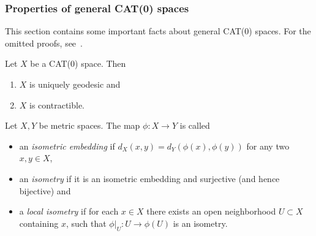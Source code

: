 
\subsubsection*{Properties of general CAT(0) spaces}

This section contains some important facts about general CAT(0) spaces. For the omitted proofs, see\ \cite{MR1744486}.

\begin{prop}[{\cite[Prop II.1.4]{MR1744486}}]
  Let \(X\) be a CAT(0) space. Then
  \begin{enumerate}
  \item \(X\) is uniquely geodesic and
  \item \(X\) is contractible.
  \end{enumerate}
\end{prop}

\begin{defin}
  Let \(X,Y\) be metric spaces. The map \(\phi \colon X \to Y\) is called
  \begin{itemize}
  \item an \emph{isometric embedding} if \(d_X(x,y) = d_Y(\phi(x), \phi(y))\) for any two \(x,y \in X\),
  \item an \emph{isometry} if it is an isometric embedding and surjective (and hence bijective) and
  \item a \emph{local isometry} if for each \(x \in X\) there exists an open neighborhood \(U \subset X\) containing \(x\), such that \(\phi|_U \colon U \to \phi(U)\) is an isometry.
  \end{itemize}
\end{defin}

